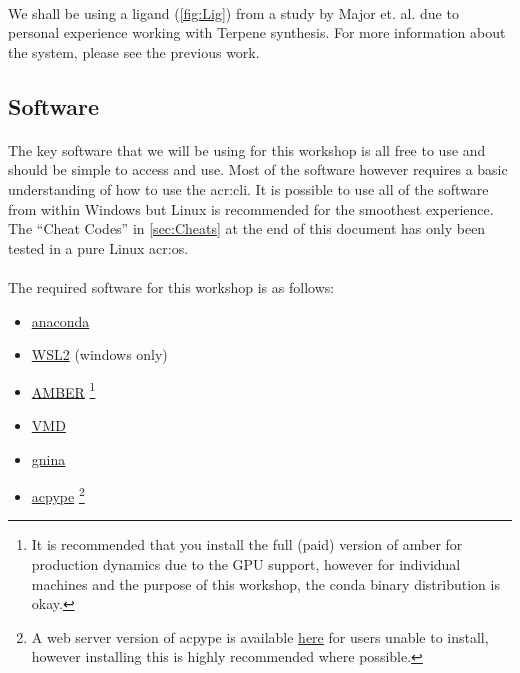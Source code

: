     \paragraph{}
    We shall be using a ligand (\cref{fig:Lig}) from a study by Major et. al.\cite{Weitman2010ChallengesMonoterpenes} due to personal experience working with Terpene synthesis. For more information about the system, please see the previous work. 

\subsection{Software}
    \paragraph{}
    The key software that we will be using for this workshop is all free to use and should be simple to access and use. Most of the software however requires a basic understanding of how to use the \gls{acr:cli}. It is possible to use all of the software from within Windows but Linux is recommended for the smoothest experience. The \enquote{Cheat Codes} in \cref{sec:Cheats} at the end of this document has only been tested in a pure Linux \gls{acr:os}.

    \paragraph{}
    The required software for this workshop is as follows:
\begin{itemize}
    \item \href{https://www.anaconda.com/download/}{anaconda}
    \item \href{https://learn.microsoft.com/en-us/windows/wsl/install}{WSL2} (windows only)
    \item \href{https://ambermd.org/GetAmber.php}{AMBER}\cite{Maier2015Ff14SB:Ff99SB} \footnote{It is recommended that you install the full (paid) version of amber for production dynamics due to the GPU support, however for individual machines and the purpose of this workshop, the conda binary distribution is okay.}
    \item \href{https://www.ks.uiuc.edu/Development/Download/download.cgi?PackageName=VMD}{VMD}\cite{WilliamHumphrey1996VMDDynamics}
    \item \href{https://github.com/gnina/gnina}{gnina}\cite{McNutt2021GNINALearning}
    \item \href{https://pypi.org/project/acpype/}{acpype} \cite{SousadaSilva2012ACPYPEInterfacE} \footnote{A web server version of acpype is available \href{https://www.bio2byte.be/acpype/submit/}{here} for users unable to install, however installing this is highly recommended where possible.}
\end{itemize}

